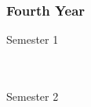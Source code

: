 \subsubsection{Fourth Year}
\begin{center}
\begin{multicols}{2}
Semester 1 \\
 \\
 \\
\vfill
\columnbreak

Semester 2 \\
 \\
 \\
\end{multicols}
\end{center}